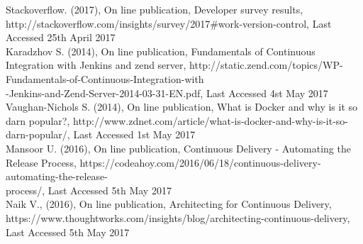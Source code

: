 \begin{thebibliography}{0}
Stackoverflow. (2017), On line publication, Developer survey results, http://stackoverflow.com/insights/survey/2017\#work-version-control, Last Accessed 25th April 2017
\\
Karadzhov S. (2014), On line publication, Fundamentals of Continuous Integration with Jenkins and zend server, http://static.zend.com/topics/WP-Fundamentals-of-Continuous-Integration-with\\
-Jenkins-and-Zend-Server-2014-03-31-EN.pdf, Last Accessed 4st May 2017
\\
Vaughan-Nichols S. (2014), On line publication, What is Docker and why is it so darn popular?, http://www.zdnet.com/article/what-is-docker-and-why-is-it-so-darn-popular/, Last Accessed 1st May 2017
\\
Mansoor U. (2016), On line publication, Continuous Delivery - Automating the Release Process, https://codeahoy.com/2016/06/18/continuous-delivery-automating-the-release-\\process/, Last Accessed 5th May 2017
\\
Naik V., (2016), On line publication, Architecting for Continuous Delivery, https://www.thoughtworks.com/insights/blog/architecting-continuous-delivery, Last Accessed 5th May 2017

\end{thebibliography}